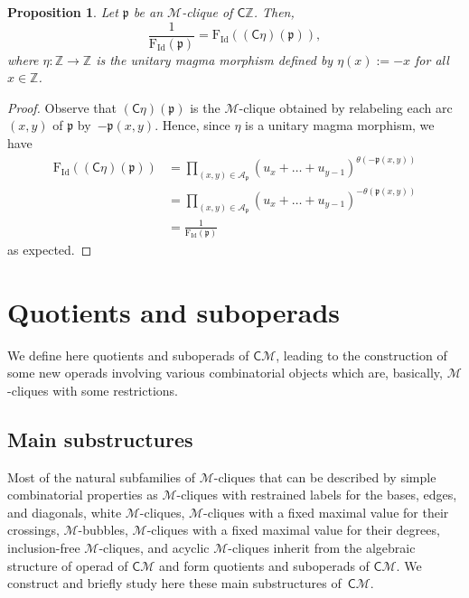 \documentclass[10pt,reqno]{amsart}
\numberwithin{equation}{subsection}
\newtheorem{Proposition}[Theorem]{Proposition}
\newcommand{\Z}{\mathbb{Z}}
\newcommand{\Mca}{\mathcal{M}}
\newcommand{\Pfr}{\mathfrak{p}}
\newcommand{\Cli}{\mathsf{C}}
\newcommand{\Arcs}{\mathcal{A}}
\newcommand{\Id}{\mathrm{Id}}
\newcommand{\Frac}{\mathrm{F}}
\begin{document}
\begin{Proposition} \label{prop:rat_fct_cliques_inverse}
    Let $\Pfr$ be an $\Mca$-clique of $\Cli\Z$. Then,
    \begin{equation}
        \frac{1}{\Frac_\Id(\Pfr)} = \Frac_\Id((\Cli \eta)(\Pfr)),
    \end{equation}
    where $\eta : \Z \to \Z$ is the unitary magma morphism defined by
    $\eta(x) := -x$ for all $x \in \Z$.
\end{Proposition}
\begin{proof}
    Observe that $(\Cli \eta)(\Pfr)$ is the $\Mca$-clique obtained by
    relabeling each arc $(x, y)$ of $\Pfr$ by~$-\Pfr(x, y)$. Hence,
    since $\eta$ is a unitary magma morphism, we have
    \begin{equation}\begin{split}
        \Frac_\Id((\Cli \eta)(\Pfr))
        & =
        \prod_{(x, y) \in \Arcs_\Pfr}
        \left(u_x + \dots + u_{y - 1}\right)^{\theta(-\Pfr(x, y))} \\
        & =
        \prod_{(x, y) \in \Arcs_\Pfr}
        \left(u_x + \dots + u_{y - 1}\right)^{-\theta(\Pfr(x, y))} \\
        & =
        \frac{1}{\Frac_\Id(\Pfr)}
    \end{split}\end{equation}
    as expected.
\end{proof}
\medskip

\section{Quotients and suboperads}\label{sec:quotients_suboperads}
We define here quotients and suboperads of $\Cli\Mca$, leading to the
construction of some new operads involving various combinatorial objects
which are, basically, $\Mca$-cliques with some restrictions.
\medskip

\subsection{Main substructures}%
\label{subsec:main_substructures}
Most of the natural subfamilies of $\Mca$-cliques that can be described
by simple combinatorial properties as $\Mca$-cliques with restrained
labels for the bases, edges, and diagonals, white $\Mca$-cliques,
$\Mca$-cliques with a fixed maximal value for their crossings,
$\Mca$-bubbles, $\Mca$-cliques with a fixed maximal value for their
degrees, inclusion-free $\Mca$-cliques, and acyclic $\Mca$-cliques
inherit from the algebraic structure of operad of $\Cli\Mca$ and form
quotients and suboperads of $\Cli\Mca$. We construct and briefly study
here these main substructures of~$\Cli\Mca$.
\medskip
\end{document}

